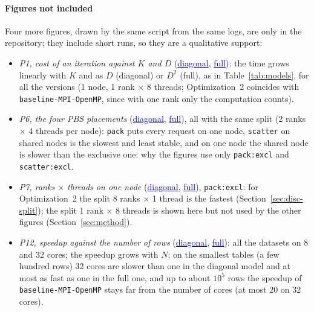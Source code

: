 \documentclass[conference,onecolumn]{IEEEtran}
\newcommand{\vbase}{\texttt{baseline-\allowbreak MPI-\allowbreak OpenMP}}
\newcommand{\repolinkas}[2]{\href{https://github.com/HPC-2627/ParallelExpectationMaximizationClustering/tree/main/#1}{\textcolor{blue}{#2}}}
\begin{document}
\paragraph{Figures not included} Four more figures, drawn by the same script from the same logs, are only in the repository; they include short runs, so they are a qualitative support:
\begin{itemize}
\item \emph{P1, cost of an iteration against $K$ and $D$} (\repolinkas{results/plots/performance/P1-sweep-diagonal.pdf}{diagonal}, \repolinkas{results/plots/performance/P1-sweep-full.pdf}{full}): the time grows linearly with $K$ and as $D$ (diagonal) or $D^2$ (full), as in Table~\ref{tab:models}, for all the versions (1 node, 1 rank $\times$ 8 threads; Optimization~2 coincides with \vbase{}, since with one rank only the computation counts).
\item \emph{P6, the four PBS placements} (\repolinkas{results/plots/performance/P6-placement-diagonal.pdf}{diagonal}, \repolinkas{results/plots/performance/P6-placement-full.pdf}{full}), all with the same split (2 ranks $\times$ 4 threads per node): \texttt{pack} puts every request on one node, \texttt{scatter} on shared nodes is the slowest and least stable, and on one node the shared node is slower than the exclusive one: why the figures use only \texttt{pack:excl} and \texttt{scatter:excl}.
\item \emph{P7, ranks $\times$ threads on one node} (\repolinkas{results/plots/performance/P7-ranks-threads-diagonal.pdf}{diagonal}, \repolinkas{results/plots/performance/P7-ranks-threads-full.pdf}{full}), \texttt{pack:excl}: for Optimization~2 the split 8 ranks $\times$ 1 thread is the fastest (Section~\ref{sec:disc-split}); the split 1 rank $\times$ 8 threads is shown here but not used by the other figures (Section~\ref{sec:method}).
\item \emph{P12, speedup against the number of rows} (\repolinkas{results/plots/performance/P12-size-diagonal.pdf}{diagonal}, \repolinkas{results/plots/performance/P12-size-full.pdf}{full}): all the datasets on 8 and 32 cores; the speedup grows with $N$; on the smallest tables (a few hundred rows) 32 cores are slower than one in the diagonal model and at most as fast as one in the full one, and up to about $10^5$ rows the speedup of \vbase{} stays far from the number of cores (at most 20 on 32 cores).
\end{itemize}
\end{document}
